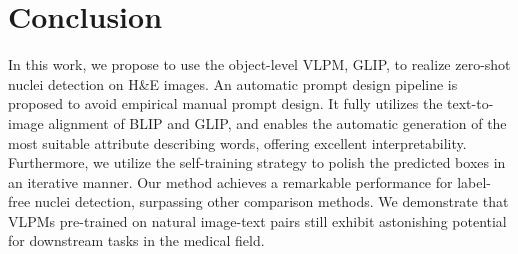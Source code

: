 \documentclass[runningheads]{llncs}
\begin{document}


\section{Conclusion}

In this work, we propose to use the object-level VLPM, GLIP, to realize zero-shot nuclei detection on H\&E images. An automatic prompt design pipeline is proposed to avoid empirical manual prompt design. It fully utilizes the text-to-image alignment of BLIP and GLIP, and enables the automatic generation of the most suitable attribute describing words, offering excellent interpretability. Furthermore, we utilize the self-training strategy to polish the predicted boxes in an iterative manner. Our method achieves a remarkable performance for label-free nuclei detection, surpassing other comparison methods. We demonstrate that VLPMs pre-trained on natural image-text pairs still exhibit astonishing potential for downstream tasks in the medical field.
\end{document}
